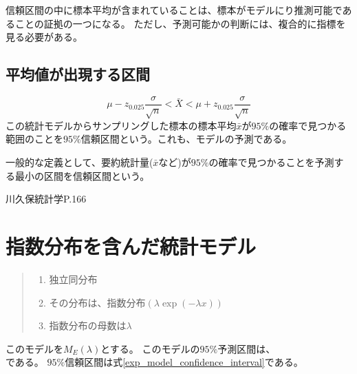 信頼区間の中に標本平均が含まれていることは、標本がモデルにり推測可能であることの証拠の一つになる。
ただし、予測可能かの判断には、複合的に指標を見る必要がある。

\subsection{平均値が出現する区間}
\begin{equation*}
    \mu - z_{0.025} \frac{\sigma}{\sqrt{n}} < \bar{X} < \mu + z_{0.025} \frac{\sigma}{\sqrt{n}}
\end{equation*}
この統計モデルからサンプリングした標本の標本平均$\bar{x}$が$95\%$の確率で見つかる範囲のことを$95\%$信頼区間という。これも、モデルの予測である。

一般的な定義として、要約統計量($\bar{x}$など)が$95\%$の確率で見つかることを予測する最小の区間を信頼区間という。

\fi

 川久保統計学P.166
 \fi









\section{指数分布を含んだ統計モデル}
\begin{quote}
    \begin{enumerate}[(1)]
    \item 独立同分布
    \item その分布は、指数分布$(\lambda\exp{(-\lambda x)})$
    \item 指数分布の母数は$\lambda$
    \end{enumerate}
\end{quote}
このモデルを$M_E(\lambda)$とする。
このモデルの$95\%$予測区間は、
\begin{equation*}
    [\frac{1}{\lambda} \log\frac{1}{1-\alpha/2} ,\frac{1}{\lambda}\log\frac{\alpha}{2} ]
\end{equation*}
である。
$95\%$信頼区間は式\ref{exp_model_confidence_interval}である。


